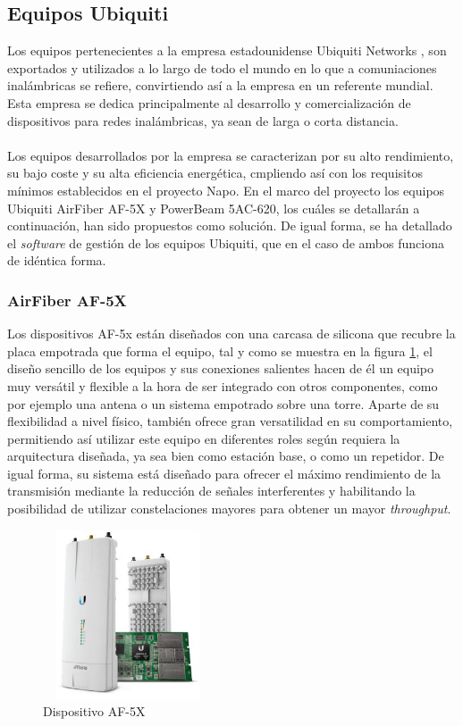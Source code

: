 \subsection{Equipos Ubiquiti}
Los equipos pertenecientes a la empresa estadounidense Ubiquiti Networks \cite{Ubiquiti}, son exportados y utilizados a lo largo de todo el mundo en lo que a comuniaciones inalámbricas se refiere, convirtiendo así a la empresa en un referente mundial. Esta empresa se dedica principalmente al desarrollo y comercialización de dispositivos para redes inalámbricas, ya sean de larga o corta distancia. \\\\

Los equipos desarrollados por la empresa se caracterizan por su alto rendimiento, su bajo coste y su alta eficiencia energética, cmpliendo así con los requisitos mínimos establecidos en el proyecto Napo. En el marco del proyecto los equipos Ubiquiti AirFiber AF-5X y PowerBeam 5AC-620, los cuáles se detallarán a continuación, han sido propuestos como solución. De igual forma, se ha detallado el \textit{software} de gestión de los equipos Ubiquiti, que en el caso de ambos funciona de idéntica forma.

\subsubsection{AirFiber AF-5X}
Los dispositivos AF-5x están diseñados con una carcasa de silicona que recubre la placa empotrada que forma el equipo, tal y como se muestra en la figura \ref{af_5x}, el diseño sencillo de los equipos y sus conexiones salientes hacen de él un equipo muy versátil y flexible a la hora de ser integrado con otros componentes, como por ejemplo una antena o un sistema empotrado sobre una torre. Aparte de su flexibilidad a nivel físico, también ofrece gran versatilidad en su comportamiento, permitiendo así utilizar este equipo en diferentes roles según requiera la arquitectura diseñada, ya sea bien como estación base, o como un repetidor. De igual forma, su sistema está diseñado para ofrecer el máximo rendimiento de la transmisión mediante la reducción de señales interferentes y habilitando la posibilidad de utilizar constelaciones mayores para obtener un mayor \textit{throughput}.

\begin{figure}[H]
		\centering
		\includegraphics[width=5cm,height=5cm]{img/af_5x.JPG}
		\caption{Dispositivo AF-5X}
		\label{af_5x}
	\end{figure}

